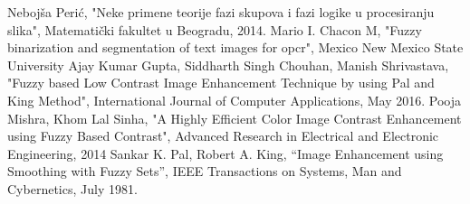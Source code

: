 \documentclass[12pt,a4paper]{article}
\theoremstyle{definition}
\theoremstyle{remark}
\theoremstyle{plain}
\begin{document}
\begin{thebibliography}{9}
  \bibitem{} Neboj\v sa Peri\' c, "Neke primene teorije fazi skupova i fazi logike u procesiranju slika", Matemati\v cki fakultet u Beogradu, 2014.
  \bibitem{} Mario I. Chacon M, "Fuzzy binarization and segmentation of text images for opcr", Mexico New Mexico State University
  \bibitem{} Ajay Kumar Gupta, Siddharth Singh Chouhan, Manish Shrivastava, "Fuzzy based Low Contrast Image Enhancement Technique by using Pal and King Method", International Journal of Computer Applications, May 2016.
  \bibitem{} Pooja Mishra, Khom Lal Sinha, "A Highly Efficient Color Image Contrast Enhancement using Fuzzy Based Contrast", Advanced Research in Electrical and Electronic Engineering, 2014
  \bibitem{} Sankar K. Pal, Robert A. King, “Image Enhancement using Smoothing with Fuzzy Sets”, IEEE Transactions on Systems, Man and Cybernetics, July 1981.
\end{thebibliography}
\end{document}
